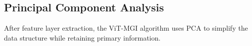 \documentclass[conference]{IEEEtran}
\begin{document}
\subsection{Principal Component Analysis}
\label{sec:method_PCA}



After feature layer extraction, the ViT-MGI algorithm uses PCA to simplify the data structure while retaining primary information.











\end{document}
